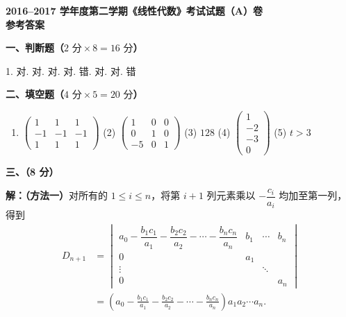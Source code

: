 \documentclass[a4paper,11pt]{ctexart}
\begin{document}
\begin{center}
  {\Large\bfseries 2016--2017 学年度第二学期《线性代数》考试试题（A）卷}\\[0.4em]
  {\large\bfseries 参考答案}
\end{center}

\vspace{0.8em}

\textbf{一、判断题（$2\text{ 分}\times 8 = 16\text{ 分}$）}

\begin{center}
  1. 对. 对. 对. 对. 错. 对. 对. 错
\end{center}

\vspace{0.6em}

\textbf{二、填空题（$4\text{ 分}\times 5 = 20\text{ 分}$）}

\begin{enumerate}[label=(\arabic*), leftmargin=2.2em, itemsep=0.5em, topsep=0.4em]
  \item $\begin{pmatrix} 1 & 1 & 1 \\ -1 & -1 & -1 \\ 1 & 1 & 1 \end{pmatrix}$\qquad
  (2) $\begin{pmatrix} 1 & 0 & 0 \\ 0 & 1 & 0 \\ -5 & 0 & 1 \end{pmatrix}$\qquad
  (3) $128$\qquad
  (4) $\begin{pmatrix} 1 \\ -2 \\ -3 \\ 0 \end{pmatrix}$\qquad
  (5) $t > 3$
\end{enumerate}

\vspace{0.8em}

\textbf{三、（8 分）}

\textbf{解：（方法一）}对所有的 $1 \leqslant i \leqslant n$，将第 $i+1$ 列元素乘以 $-\dfrac{c_i}{a_i}$ 均加至第一列，得到
\begin{align*}
  D_{n+1} &= \begin{vmatrix}
    a_0 - \dfrac{b_1 c_1}{a_1} - \dfrac{b_2 c_2}{a_2} - \cdots - \dfrac{b_n c_n}{a_n} & b_1 & \cdots & b_n \\
    0 & a_1 & & \\
    \vdots & & \ddots & \\
    0 & & & a_n
  \end{vmatrix} \\
  &= \left(a_0 - \frac{b_1 c_1}{a_1} - \frac{b_2 c_2}{a_2} - \cdots - \frac{b_n c_n}{a_n}\right) a_1 a_2 \cdots a_n.
\end{align*}
\end{document}
